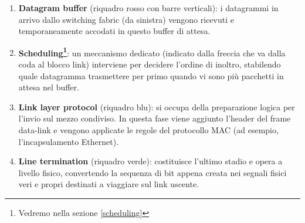 \documentclass[a4paper,12pt]{report}
\begin{document}
\begin{enumerate}
    \item \textbf{Datagram buffer} (riquadro rosso con barre verticali): i datagrammi in arrivo dallo switching fabric (da sinistra) vengono ricevuti e temporaneamente accodati in questo buffer di attesa.
    \item \textbf{Scheduling\footnote{Vedremo nella sezione \ref{scheduling}}}: un meccanismo dedicato (indicato dalla freccia che va dalla coda al blocco link) interviene per decidere l'ordine di inoltro, stabilendo quale datagramma trasmettere per primo quando vi sono più pacchetti in attesa nel buffer.
    \item \textbf{Link layer protocol} (riquadro blu): si occupa della preparazione logica per l'invio sul mezzo condiviso. In questa fase viene aggiunto l'header del frame data-link e vengono applicate le regole del protocollo MAC (ad esempio, l'incapsulamento Ethernet).
    \item \textbf{Line termination} (riquadro verde): costituisce l'ultimo stadio e opera a livello fisico, convertendo la sequenza di bit appena creata nei segnali fisici veri e propri destinati a viaggiare sul link uscente.
\end{enumerate}
\end{document}
